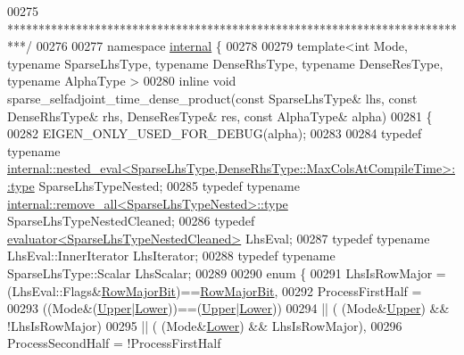\begin{DoxyCode}
00275 \textcolor{comment}{***************************************************************************/}
00276 
00277 \textcolor{keyword}{namespace }\hyperlink{namespaceinternal}{internal} \{
00278 
00279 \textcolor{keyword}{template}<\textcolor{keywordtype}{int} Mode, \textcolor{keyword}{typename} SparseLhsType, \textcolor{keyword}{typename} DenseRhsType, \textcolor{keyword}{typename} DenseResType, \textcolor{keyword}{typename} AlphaType
      >
00280 \textcolor{keyword}{inline} \textcolor{keywordtype}{void} sparse\_selfadjoint\_time\_dense\_product(\textcolor{keyword}{const} SparseLhsType& lhs, \textcolor{keyword}{const} DenseRhsType& rhs, 
      DenseResType& res, \textcolor{keyword}{const} AlphaType& alpha)
00281 \{
00282   EIGEN\_ONLY\_USED\_FOR\_DEBUG(alpha);
00283   
00284   \textcolor{keyword}{typedef} \textcolor{keyword}{typename} 
      \hyperlink{class_eigen_1_1internal_1_1_tensor_lazy_evaluator_writable}{internal::nested\_eval<SparseLhsType,DenseRhsType::MaxColsAtCompileTime>::type}
       SparseLhsTypeNested;
00285   \textcolor{keyword}{typedef} \textcolor{keyword}{typename} \hyperlink{group___sparse_core___module}{internal::remove\_all<SparseLhsTypeNested>::type}
       SparseLhsTypeNestedCleaned;
00286   \textcolor{keyword}{typedef} \hyperlink{struct_eigen_1_1internal_1_1evaluator}{evaluator<SparseLhsTypeNestedCleaned>} LhsEval;
00287   \textcolor{keyword}{typedef} \textcolor{keyword}{typename} LhsEval::InnerIterator LhsIterator;
00288   \textcolor{keyword}{typedef} \textcolor{keyword}{typename} SparseLhsType::Scalar LhsScalar;
00289   
00290   \textcolor{keyword}{enum} \{
00291     LhsIsRowMajor = (LhsEval::Flags&\hyperlink{group__flags_gae4f56c2a60bbe4bd2e44c5b19cbe8762}{RowMajorBit})==\hyperlink{group__flags_gae4f56c2a60bbe4bd2e44c5b19cbe8762}{RowMajorBit},
00292     ProcessFirstHalf =
00293               ((Mode&(\hyperlink{group__enums_gga39e3366ff5554d731e7dc8bb642f83cda6bcb58be3b8b8ec84859ce0c5ac0aaec}{Upper}|\hyperlink{group__enums_gga39e3366ff5554d731e7dc8bb642f83cda891792b8ed394f7607ab16dd716f60e6}{Lower}))==(\hyperlink{group__enums_gga39e3366ff5554d731e7dc8bb642f83cda6bcb58be3b8b8ec84859ce0c5ac0aaec}{Upper}|\hyperlink{group__enums_gga39e3366ff5554d731e7dc8bb642f83cda891792b8ed394f7607ab16dd716f60e6}{Lower}))
00294           || ( (Mode&\hyperlink{group__enums_gga39e3366ff5554d731e7dc8bb642f83cda6bcb58be3b8b8ec84859ce0c5ac0aaec}{Upper}) && !LhsIsRowMajor)
00295           || ( (Mode&\hyperlink{group__enums_gga39e3366ff5554d731e7dc8bb642f83cda891792b8ed394f7607ab16dd716f60e6}{Lower}) && LhsIsRowMajor),
00296     ProcessSecondHalf = !ProcessFirstHalf

\end{DoxyCode}

